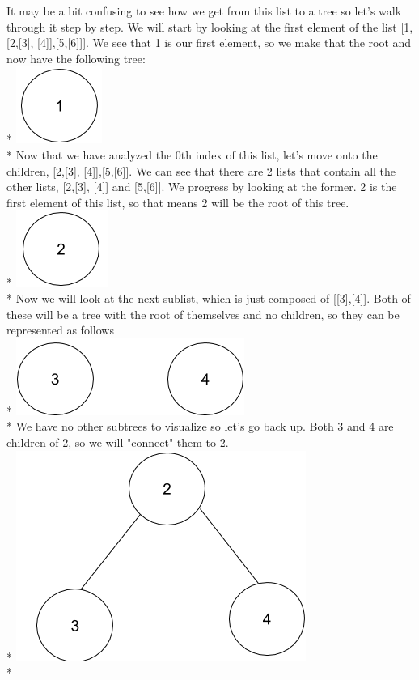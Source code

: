 \documentclass{article}
\begin{document}
It may be a bit confusing to see how we get from this list to a tree so let's walk through it step by step. We will start by looking at the first element of the list [1, [2,[3], [4]],[5,[6]]]. We see that 1 is our first element, so we make that the root and now have the following tree: \\*
\includegraphics[scale=.34]{../images/treeex1.png}  \\*
Now that we have analyzed the 0th index of this list, let's move onto the children, [2,[3], [4]],[5,[6]]. We can see that there are 2 lists that contain all the other lists, [2,[3], [4]] and [5,[6]]. We progress by looking at the former. 2 is the first element of this list, so that means 2 will be the root of this tree. \\*
\includegraphics[scale=.34]{../images/treeex2.png}  \\*
Now we will look at the next sublist, which is just composed of [[3],[4]]. Both of these will be a tree with the root of themselves and no children, so they can be represented as follows \\*
\includegraphics[scale=.34]{../images/treeex3.png}  \\*
We have no other subtrees to visualize so let's go back up. Both 3 and 4 are children of  2, so we will "connect" them to 2.\\*
\includegraphics[scale=.34]{../images/treeex4.png}  \\*
\end{document}
